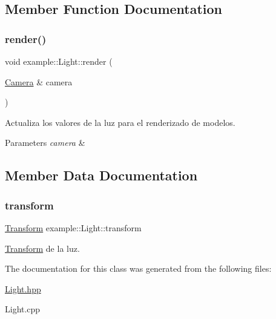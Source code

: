 \subsection{Member Function Documentation}
\mbox{\label{classexample_1_1_light_a997d9866ab2e690bb7fb1988a55da627}} 
\subsubsection{\texorpdfstring{render()}{render()}}
{\footnotesize\ttfamily void example\+::\+Light\+::render (\begin{DoxyParamCaption}\item[{\mbox{\hyperlink{classexample_1_1_camera}{Camera}} \&}]{camera }\end{DoxyParamCaption})}



Actualiza los valores de la luz para el renderizado de modelos. 


\begin{DoxyParams}{Parameters}
{\em camera} & \\
\hline
\end{DoxyParams}


\subsection{Member Data Documentation}
\mbox{\label{classexample_1_1_light_a0780705a3879661b90acdb113818f6c3}} 
\subsubsection{\texorpdfstring{transform}{transform}}
{\footnotesize\ttfamily \mbox{\hyperlink{classexample_1_1_transform}{Transform}} example\+::\+Light\+::transform}



\mbox{\hyperlink{classexample_1_1_transform}{Transform}} de la luz. 



The documentation for this class was generated from the following files\+:\begin{DoxyCompactItemize}
\item 
\mbox{\hyperlink{_light_8hpp}{Light.\+hpp}}\item 
Light.\+cpp\end{DoxyCompactItemize}

